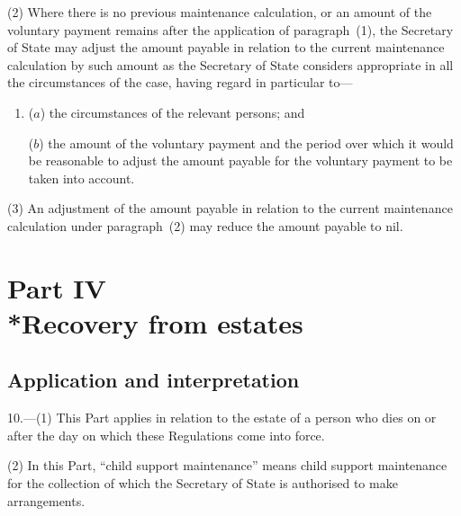 \documentclass[12pt,a4paper]{article}
\begin{document}
(2) Where there is no previous maintenance calculation, or an amount of the voluntary payment remains after the application of paragraph~(1), the 
Secretary of State  %
may adjust the amount payable in relation to the current maintenance calculation by such amount as 
the Secretary of State  %
considers appropriate in all the circumstances of the case, having regard in particular to—
\begin{enumerate}\item[]
($a$) the circumstances of the relevant persons; and

($b$) the amount of the voluntary payment and the period over which it would be reasonable to adjust the amount payable for the voluntary payment to be taken into account.
\end{enumerate}

(3) An adjustment of the amount payable in relation to the current maintenance calculation under paragraph~(2) may reduce the amount payable to nil.


\section[Part IV --- Recovery from estates]{Part IV\\*Recovery from estates}

\renewcommand\parthead{--- Part IV}

\subsection[10. Application and interpretation]{Application and interpretation}

10.---(1)  This Part applies in relation to the estate of a person who dies on or after the day on which these Regulations come into force.

(2) In this Part, “child support maintenance” means child support maintenance for the collection of which the 
Secretary of State  %
is authorised to make arrangements.

\end{document}
